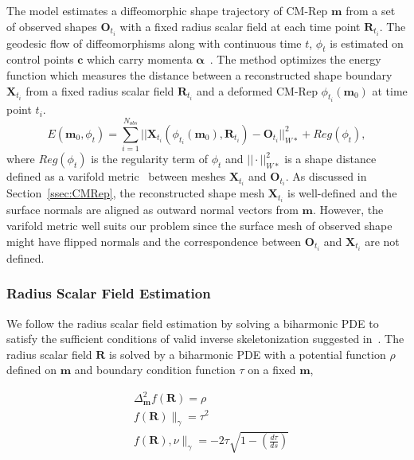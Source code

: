 \documentclass{llncs}
\begin{document}
The model estimates a diffeomorphic shape  trajectory of CM-Rep $\mathbf{m}$ from a set of observed shapes $\mathbf{O}_{t_i}$ with a fixed radius scalar field at each time point $\mathbf{R}_{t_i}$.
The geodesic flow of diffeomorphisms along with continuous time $t$, $\phi_t$ is estimated on control points $\mathbf{c}$ which carry momenta $\mathbf{\alpha}$~\cite{Fishbaugh2013}.
The method optimizes the energy function which measures the distance between a reconstructed shape boundary $\mathbf{X}_{t_i}$ from a fixed radius scalar field $\mathbf{R}_{t_i}$ and a deformed CM-Rep  $\phi_{t_i}( \mathbf{m}_0 )$ at time point $t_i$. 
\begin{equation}
 E( \mathbf{m}_0, \phi_t ) = \sum_{i=1}^{N_{obs}} || \mathbf{X}_{t_i} ( \phi_{t_i} (\mathbf{m}_0), \mathbf{R}_{t_i} ) - \mathbf{O}_{t_i} ||^2_{\mathit{W}*} + Reg( \phi_t ),
\end{equation}
where $Reg(\phi_t)$ is the regularity term of $\phi_t$ and $||\cdot||_{\mathit{W}*}^2$ is a shape distance defined as a varifold metric~\cite{Charon2013} between meshes $\mathbf{X}_{t_i}$ and $\mathbf{O}_{t_i}$.
As discussed in Section~\ref{ssec:CMRep}, the reconstructed shape mesh $\mathbf{X}_{t_i}$ is well-defined and the surface normals are aligned as outward normal vectors from $\mathbf{m}$. 
However, the varifold metric well suits our problem since the surface mesh of observed shape might have flipped normals and the correspondence between $\mathbf{O}_{t_i}$ and $\mathbf{X}_{t_i}$ are not defined. 

\subsubsection{Radius Scalar Field Estimation}
\label{sssec:RadUpdate}

We follow the radius scalar field estimation by solving a biharmonic PDE to satisfy the sufficient conditions of valid inverse skeletonization suggested in~\cite{Yushkevich2009}.
The radius scalar field $\mathbf{R}$ is solved by a biharmonic PDE with a potential function $\rho$ defined on $\mathbf{m}$ and boundary condition function $\tau$ on a fixed $\mathbf{m}$,

\begin{align}
 &\Delta_{\mathbf{m}}^2 f(\mathbf{R}) = \rho \\
 &f(\mathbf{R}) \|_{\gamma} = \tau^2 \\
 &f(\mathbf{R}), \nu \|_\gamma = -2 \tau \sqrt{ 1 - ( \frac{d\tau}{ds} ) } 
\label{eq:BiPDE}
\end{align}
\end{document}

